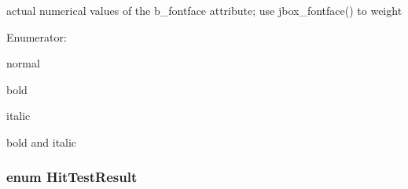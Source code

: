 actual numerical values of the b\_\-fontface attribute; use jbox\_\-fontface() to weight \begin{Desc}
\item[Enumerator: ]\par
\begin{description}
\item[{\em 
\hypertarget{group__jbox_gga80155586fa275b28773c9b203f52cabaa0071b2aa858b0b85866ec55f920661ea}{
JBOX\_\-FONTFACE\_\-REGULAR}
\label{group__jbox_gga80155586fa275b28773c9b203f52cabaa0071b2aa858b0b85866ec55f920661ea}
}]normal \item[{\em 
\hypertarget{group__jbox_gga80155586fa275b28773c9b203f52cabaa7c5afcc54470110f9adafe6643860e33}{
JBOX\_\-FONTFACE\_\-BOLD}
\label{group__jbox_gga80155586fa275b28773c9b203f52cabaa7c5afcc54470110f9adafe6643860e33}
}]bold \item[{\em 
\hypertarget{group__jbox_gga80155586fa275b28773c9b203f52cabaa804e35b0947d1056b75c0b7416aed5f1}{
JBOX\_\-FONTFACE\_\-ITALIC}
\label{group__jbox_gga80155586fa275b28773c9b203f52cabaa804e35b0947d1056b75c0b7416aed5f1}
}]italic \item[{\em 
\hypertarget{group__jbox_gga80155586fa275b28773c9b203f52cabaac504521024538cbb38406272126cb30b}{
JBOX\_\-FONTFACE\_\-BOLDITALIC}
\label{group__jbox_gga80155586fa275b28773c9b203f52cabaac504521024538cbb38406272126cb30b}
}]bold and italic \end{description}
\end{Desc}

\hypertarget{group__jbox_ga956a254a140565aa9ff36a514740e021}{
\subsubsection[{HitTestResult}]{\setlength{\rightskip}{0pt plus 5cm}enum {\bf HitTestResult}}}
\label{group__jbox_ga956a254a140565aa9ff36a514740e021}


